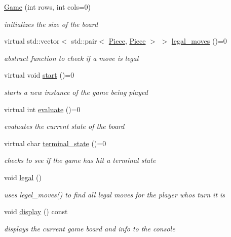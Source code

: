 \begin{DoxyCompactItemize}
\item 
\hyperlink{class_game_ac8c9003009977a0ecf0c35e0002f0f9e}{Game} (int rows, int cols=0)
\begin{DoxyCompactList}\small\item\em initializes the size of the board \end{DoxyCompactList}\item 
virtual std\+::vector$<$ std\+::pair$<$ \hyperlink{class_piece}{Piece}, \hyperlink{class_piece}{Piece} $>$ $>$ \hyperlink{class_game_a205fc7dd195bc398138cc188aad8bc38}{legal\+\_\+moves} ()=0
\begin{DoxyCompactList}\small\item\em abstract function to check if a move is legal \end{DoxyCompactList}\item 
virtual void \hyperlink{class_game_add988158041df85337995e36f06756aa}{start} ()=0
\begin{DoxyCompactList}\small\item\em starts a new instance of the game being played \end{DoxyCompactList}\item 
virtual int \hyperlink{class_game_a068b2b3012154457f362c90a80f46253}{evaluate} ()=0
\begin{DoxyCompactList}\small\item\em evaluates the current state of the board \end{DoxyCompactList}\item 
virtual char \hyperlink{class_game_ac7cbe36964272dd7dcd7e68fafaf24cc}{terminal\+\_\+state} ()=0
\begin{DoxyCompactList}\small\item\em checks to see if the game has hit a terminal state \end{DoxyCompactList}\item 
\mbox{\label{class_game_a69f0e2636aa7e85836418aea42792527}} 
void \hyperlink{class_game_a69f0e2636aa7e85836418aea42792527}{legal} ()
\begin{DoxyCompactList}\small\item\em uses legel\+\_\+moves() to find all legal moves for the player whos turn it is \end{DoxyCompactList}\item 
void \hyperlink{class_game_ae98bb6563800f3265d7da2445804ea97}{display} () const
\begin{DoxyCompactList}\small\item\em displays the current game board and info to the console \end{DoxyCompactList}\item 

\end{DoxyCompactItemize}
